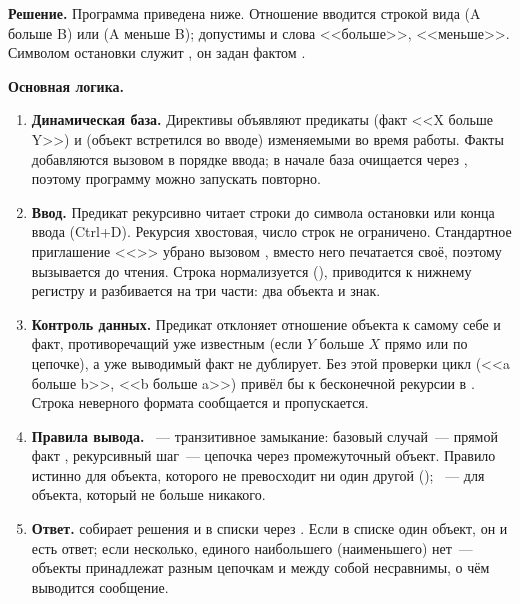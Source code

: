 \documentclass[14pt,a4paper]{extarticle}
\begin{document}
\textbf{Решение.} Программа  приведена ниже. Отношение вводится строкой вида  (A больше B) или  (A меньше B); допустимы и слова <<больше>>, <<меньше>>. Символом остановки служит \code{\#}, он задан фактом .


\textbf{Основная логика.}

\begin{enumerate}
\item \textbf{Динамическая база.} Директивы  объявляют предикаты  (факт <<X больше Y>>) и  (объект встретился во вводе) изменяемыми во время работы. Факты добавляются вызовом  в порядке ввода; в начале  база очищается через , поэтому программу можно запускать повторно.
\item \textbf{Ввод.} Предикат  рекурсивно читает строки  до символа остановки или конца ввода (Ctrl+D). Рекурсия хвостовая, число строк не ограничено. Стандартное приглашение <<\code{|: }>> убрано вызовом , вместо него печатается своё, поэтому  вызывается до чтения. Строка нормализуется (), приводится к нижнему регистру и разбивается  на три части: два объекта и знак.
\item \textbf{Контроль данных.} Предикат  отклоняет отношение объекта к самому себе и факт, противоречащий уже известным (если $Y$ больше $X$ прямо или по цепочке), а уже выводимый факт не дублирует. Без этой проверки цикл (<<a больше b>>, <<b больше a>>) привёл бы к бесконечной рекурсии в . Строка неверного формата сообщается и пропускается.
\item \textbf{Правила вывода.} ~--- транзитивное замыкание: базовый случай~--- прямой факт , рекурсивный шаг~--- цепочка через промежуточный объект. Правило  истинно для объекта, которого не превосходит ни один другой (); ~--- для объекта, который не больше никакого.
\item \textbf{Ответ.}  собирает решения  и  в списки через . Если в списке один объект, он и есть ответ; если несколько, единого наибольшего (наименьшего) нет~--- объекты принадлежат разным цепочкам и между собой несравнимы, о чём выводится сообщение.
\end{enumerate}
\end{document}
